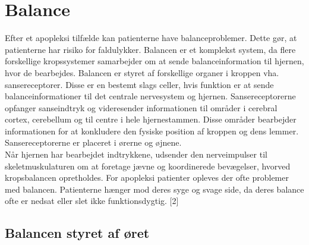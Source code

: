 \section{Balance}
Efter et apopleksi tilfælde kan patienterne have balanceproblemer. Dette gør, at patienterne har risiko for faldulykker. Balancen er et komplekst system, da flere forskellige kropssystemer samarbejder om at sende balanceinformation til hjernen, hvor de bearbejdes. Balancen er styret af forskellige organer i kroppen vha. sansereceptorer. Disse er en bestemt slags celler, hvis funktion er at sende balanceinformationer til det centrale nervesystem og hjernen. Sansereceptorerne opfanger sanseindtryk og videresender informationen til områder i cerebral cortex, cerebellum og til centre i hele hjernestammen. Disse områder bearbejder informationen for at konkludere den fysiske position af kroppen og dens lemmer. Sansereceptorerne er placeret i ørerne og øjnene. \cite{Martini2012}   \\
Når hjernen har bearbejdet indtrykkene, udsender den nerveimpulser til skeletmuskulaturen om at foretage jævne og koordinerede bevægelser, hvorved kropsbalancen opretholdes.\cite{Martini2012} For apopleksi patienter opleves der ofte problemer med balancen. Patienterne hænger mod deres syge og svage side, da deres balance ofte er nedsat eller slet ikke funktionsdygtig. [2]

\subsection{Balancen styret af øret} 

